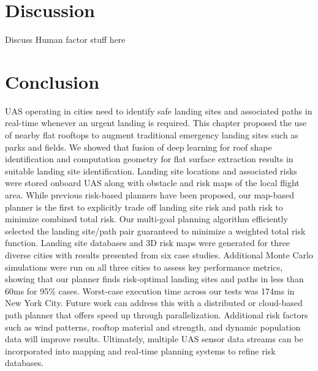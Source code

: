 \section{Discussion}


Discuss Human factor stuff here



\section{Conclusion}\label{sec:ch5_conclusion}

UAS operating in cities need to identify safe landing sites and associated paths in real-time whenever an urgent landing is required. This chapter proposed the use of nearby flat rooftops to augment traditional emergency landing sites such as parks and fields. We showed that fusion of deep learning for roof shape identification and computation geometry for flat surface extraction results in suitable landing site identification.  Landing site locations and associated risks were stored onboard UAS along with obstacle and risk maps of the local flight area.
While previous risk-based planners have been proposed, our map-based planner is the first to explicitly trade off landing site risk and path risk to minimize combined total risk. Our multi-goal planning algorithm efficiently selected the landing site/path pair guaranteed to minimize a weighted total risk function. Landing site databases and 3D risk maps were generated for three diverse cities with results presented from six case studies. Additional Monte Carlo simulations were run on all three cities to assess key performance metrics, showing that our planner finds risk-optimal landing sites and paths in less than 60ms for 95\% cases. Worst-case execution time across our tests was 174ms in New York City. Future work can address this with a distributed or cloud-based path planner that offers speed up through parallelization. Additional risk factors such as wind patterns, rooftop material and strength, and dynamic population data will improve results. Ultimately, multiple UAS sensor data streams can be incorporated into mapping and real-time planning systems to refine risk databases.